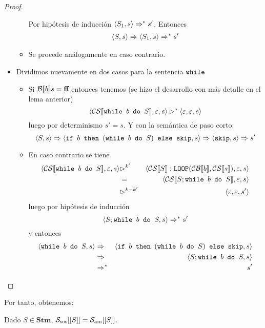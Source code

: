 \begin{lema}
\begin{proof}
\begin{itemize}
\begin{itemize}
\[        \]
        Por hipótesis de inducción $\langle S_1, s \rangle \Rightarrow^* s'$. Entonces
        \begin{eqnarray*}
            \langle S, s \rangle \Rightarrow \langle S_1, s \rangle \Rightarrow^* s'
        \end{eqnarray*}
        \item Se procede análogamente en caso contrario.
    \end{itemize}
    \item Dividimos nuevamente en dos casos para la sentencia $\texttt{while }$
    \begin{itemize}
        \item Si $\mathcal{B}[\![b]\!]s = \textbf{ff}$ entonces tenemos (se hizo el desarrollo con más detalle en el lema anterior)
        \[
            \langle \mathcal{CS}[\![\texttt{while } b \texttt{ do } S]\!], \varepsilon, s \rangle \rhd^* \langle \varepsilon, \varepsilon, s \rangle 
        \]
        luego por determinismo $s' = s$. Y con la semántica de paso corto:
        \[
            \langle S, s \rangle \Rightarrow \langle \texttt{if } b \texttt{ then } (\texttt{while } b \texttt{ do } S) \texttt{ else } \texttt{skip}, s \rangle \Rightarrow \langle \texttt{skip}, s \rangle \Rightarrow  s'
        \]
        \item En caso contrario se tiene
        \begin{eqnarray*}
            \conf{\fc{CS}{\nwhile b \ndo S}}{\varepsilon}{s} &\rhd^{k'}& \conf{\fc{CS}{S}:\n{LOOP}(\fc{CB}{b}, \fc{CS}{s})}{\varepsilon}{s} \\
            &=& \conf{\fc{CS}{S; \nwhile b \ndo S}}{\varepsilon}{s} \\
            &\rhd^{k-k'}& \conf{\varepsilon}{\varepsilon}{s'}
        \end{eqnarray*}
        luego por hipótesis de inducción
        \[
            \langle S; \texttt{while } b \texttt{ do } S, s \rangle \Rightarrow^* s'
        \]
        y entonces
        \begin{eqnarray*}
            \langle \texttt{while } b \texttt{ do } S, s \rangle &\Rightarrow& \langle \texttt{if } b \texttt{ then } (\texttt{while } b \texttt{ do } S) \texttt{ else } \texttt{skip}, s \rangle \\
            &\Rightarrow& \langle S; \texttt{while } b \texttt{ do } S, s \rangle \\
            &\Rightarrow^*& s'
        \end{eqnarray*}
    \end{itemize}
\end{itemize}
\end{proof}
\end{lema}

Por tanto, obtenemos:
\begin{theorem}
Dado $S \in \mathbf{Stm}$, $\mathcal{S}_{\mathrm{sos}}[[S]]= \mathcal{S}_{\mathrm{am}}[[S]]$.
\end{theorem}

